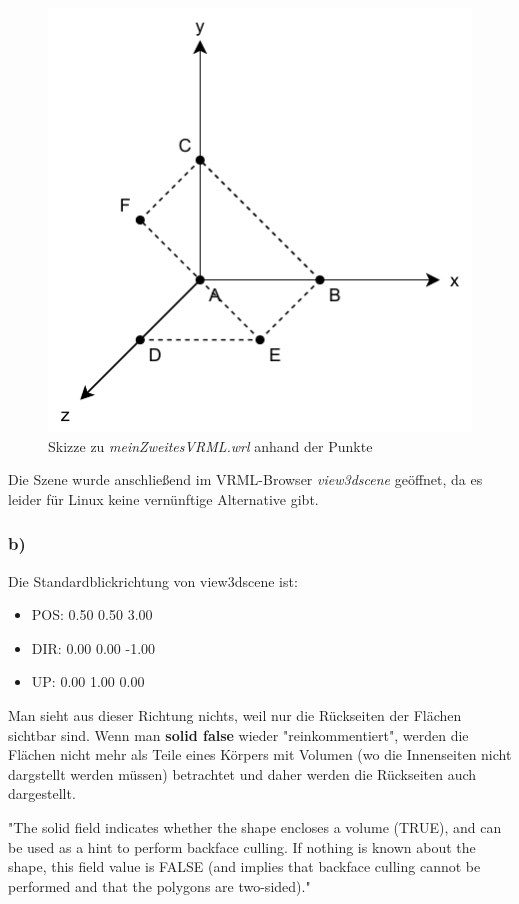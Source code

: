 \documentclass{article}
\begin{document}
\begin{figure}[!h]
    \centering
    \includegraphics{V2_Sketch.pdf}
    \caption{Skizze zu \textit{meinZweitesVRML.wrl} anhand der Punkte}
\end{figure}

Die Szene wurde anschließend im VRML-Browser \textit{view3dscene} geöffnet, da es
leider für Linux keine vernünftige Alternative gibt.

\subsubsection*{b)}
Die Standardblickrichtung von view3dscene ist:
\begin{itemize}
    \item POS: 0.50 0.50 3.00
    \item DIR: 0.00 0.00 -1.00
    \item UP: 0.00 1.00 0.00
\end{itemize}

Man sieht aus dieser Richtung nichts, weil nur die Rückseiten der Flächen
sichtbar sind. Wenn man \textbf{solid false} wieder "reinkommentiert",
werden die Flächen nicht mehr als Teile eines Körpers mit Volumen (wo die
Innenseiten nicht dargstellt werden müssen) betrachtet und daher werden
die Rückseiten auch dargestellt.

"The solid field indicates whether the shape encloses a volume (TRUE), and
 can be used as a hint to perform backface culling. If nothing is known
 about the shape, this field value is FALSE (and implies that backface culling
 cannot be performed and that the polygons are two-sided)."
 
\end{document}
